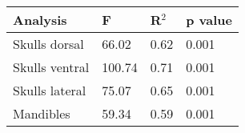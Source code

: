 

\begin{tabular}[t]{l l l l }		
\hline
\textbf{Analysis} & \textbf{F} & \textbf{R$^2$} & \textbf{p value} \\
\hline
Skulls dorsal & 66.02 & 0.62 & 0.001 \\
Skulls ventral & 100.74 & 0.71 &0.001 \\
Skulls lateral & 75.07 & 0.65 & 0.001 \\
Mandibles & 59.34 & 0.59 & 0.001 \\
\hline
\end{tabular}